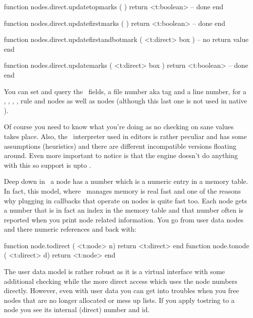 \starttyping[option=LUA]
function nodes.direct.updatetopmarks ( )
    return <t:boolean> -- done
end

function nodes.direct.updatefirstmarks ( )
    return <t:boolean> -- done
end

function nodes.direct.updatefirstandbotmark ( <t:direct> box )
    -- no return value
end

function nodes.direct.updatemarks ( <t:direct> box )
    return <t:boolean> -- done
end
\stoptyping

\stopsubsection

\startsubsection[title={\SYNCTEX}]

You can set and query the \SYNCTEX\ fields, a file number aka tag and a line
number, for a , , , , \type
{rule} and  nodes as well as  nodes (although this last
one is not used in native \SYNCTEX).

Of course you need to know what you're doing as no checking on sane values takes
place. Also, the \SYNCTEX\ interpreter used in editors is rather peculiar and has
some assumptions (heuristics) and there are different incompatible versions
floating around. Even more important to notice is that the engine doesn't do
anything with this so support is upto \LUA.

\stopsubsection

\startsubsection[title={Two access models}]

Deep down in \TEX\ a node has a number which is a numeric entry in a memory
table. In fact, this model, where \TEX\ manages memory is real fast and one of
the reasons why plugging in callbacks that operate on nodes is quite fast too.
Each node gets a number that is in fact an index in the memory table and that
number often is reported when you print node related information. You go from
user data nodes and there numeric references and back with:

\starttyping[option=LUA]
function node.todirect ( <t:node>   n) return <t:direct> end
function node.tonode   ( <t:direct> d) return <t:node>   end
\stoptyping

The user data model is rather robust as it is a virtual interface with some
additional checking while the more direct access which uses the node numbers
directly. However, even with user data you can get into troubles when you free
nodes that are no longer allocated or mess up lists. If you apply \type
{tostring} to a node you see its internal (direct) number and id.

